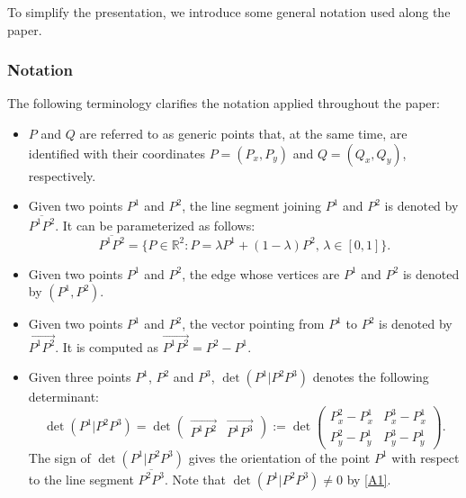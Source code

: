 \documentclass[a4paper,  review, authoryear, 1p.]{elsarticle}
\newcommand{\SPPN}{{\sf{H-SPPN}\xspace }}
\newcommand{\segment}[2]{\overline{#1#2}}
\newcommand{\determinant}[3]{\det({#1|#2#3})}
\begin{document}
		
		To simplify the presentation, we introduce some general notation used along the paper.
		\subsubsection*{Notation} 
		
		The following terminology clarifies the notation applied throughout the paper: 
		\begin{itemize}
			\item $P$ and $Q$ are referred to as generic points that, at the same time, are identified with their coordinates $P=(P_x, P_y)$ and $Q=(Q_x, Q_y)$, respectively.
			\item Given two points $P^1$ and $P^2$, the line segment joining $P^1$ and $P^2$ is denoted by $\segment{P^1}{P^2}$. It can be parameterized as follows:
			$$\segment{P^1}{P^2}=\{P\in\mathbb R^2:P=\lambda P^1 + (1-\lambda)P^2,\,\lambda\in[0,1]\}.$$
			\item  Given two points $P^1$ and $P^2$, the edge whose vertices are $P^1$ and $P^2$ is denoted by $(P^1, P^2)$.
			\item  Given two points $P^1$ and $P^2$, the vector pointing from $P^1$ to $P^2$ is denoted by $\overrightarrow{P^1P^2}$. It is computed as
			$\overrightarrow{P^1P^2}=P^2-P^1.$
			\item Given three points $P^1$, $P^2$ and $P^3$, $\determinant{P^1}{P^2}{P^3}$ denotes the following determinant:
			$$
			\determinant{P^1}{P^2}{P^3}=\det\left(\begin{array}{c|c} \overrightarrow{P^1P^2} & \overrightarrow{P^1P^3}\end{array}\right):=\det\left( \begin{array}{cc}  P^2_x-P^1_x & P^3_x-P^1_x \\ P_y^2-P^1_y & P_y^3-P_y^1 \end{array}\right).
			$$
			The sign of $\determinant{P^1}{P^2}{P^3}$ gives the orientation of the point $P^1$ with respect to the line segment $\segment{P^2}{P^3}.$ Note that $\determinant{P^1}{P^2}{P^3}\neq 0$ by \ref{A1}. 
		\end{itemize}
		
\end{document}
